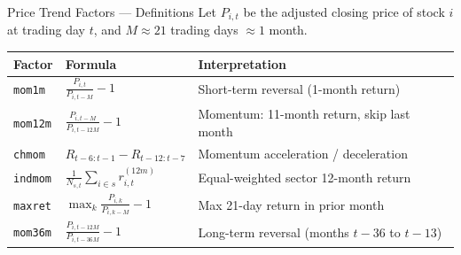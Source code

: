 \documentclass[aspectratio=169]{beamer}
\begin{document}
%
%
\begin{frame}{Price Trend Factors --- Definitions}
\small
Let $P_{i,t}$ be the adjusted closing price of stock $i$ at trading day $t$, and $M \approx 21$ trading days $\approx 1$ month.

\vspace{0.2cm}

\renewcommand{\arraystretch}{1.5}
\begin{tabular}{@{}lll@{}}
\toprule
\textbf{Factor} & \textbf{Formula} & \textbf{Interpretation} \\
\midrule
\texttt{mom1m} &
$\displaystyle\frac{P_{i,t}}{P_{i,t-M}} - 1$ &
Short-term reversal (1-month return)\\[4pt]
\texttt{mom12m} &
$\displaystyle\frac{P_{i,t-M}}{P_{i,t-12M}} - 1$ &
Momentum: 11-month return, skip last month \\[4pt]
\texttt{chmom} &
$\displaystyle R_{t-6:t-1} - R_{t-12:t-7}$ &
Momentum acceleration / deceleration \\[4pt]
\texttt{indmom} &
$\displaystyle\frac{1}{N_{s,t}}\sum_{i\in s} r^{(12m)}_{i,t}$ &
Equal-weighted sector 12-month return \\[4pt]
\texttt{maxret} &
$\displaystyle\max_{k} \frac{P_{i,k}}{P_{i,k-M}}-1$ &
Max 21-day return in prior month \\[4pt]
\texttt{mom36m} &
$\displaystyle\frac{P_{i,t-12M}}{P_{i,t-36M}} - 1$ &
Long-term reversal (months $t{-}36$ to $t{-}13$) \\
\bottomrule
\end{tabular}

\end{frame}
%
%
\end{document}
